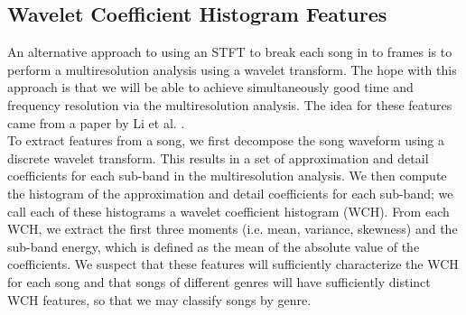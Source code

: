 \documentclass[12pt]{article}
\begin{document}

\subsection{Wavelet Coefficient Histogram Features}
An alternative approach to using an STFT to break each song in to frames is to perform a multiresolution analysis using a wavelet transform.  The hope with this approach is that we will be able to achieve simultaneously good time and frequency resolution via the multiresolution analysis.  The idea for these features came from a paper by Li et al. \cite{li:comp_study}.\\

To extract features from a song, we first decompose the song waveform using a discrete wavelet transform.  This results in a set of approximation and detail coefficients for each sub-band in the multiresolution analysis.  We then compute the histogram of the approximation and detail coefficients for each sub-band; we call each of these histograms a wavelet coefficient histogram (WCH).  From each WCH, we extract the first three moments (i.e. mean, variance, skewness) and the sub-band energy, which is defined as the mean of the absolute value of the coefficients.  We suspect that these features will sufficiently characterize the WCH for each song and that songs of different genres will have sufficiently distinct WCH features, so that we may classify songs by genre.\\
\end{document}
